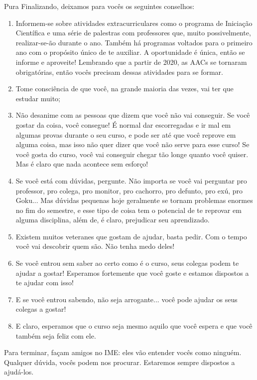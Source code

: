 \begin{subsecao}{Pura}
Finalizando, deixamos para vocês os seguintes conselhos:
\begin{enumerate}
\item Informem-se sobre atividades extracurriculares como o programa de
Iniciação Científica e uma série de palestras com professores que, muito possivelmente,
realizar-se-ão durante o ano. Também há programas voltados para o primeiro ano
com o propósito único de te auxiliar. A oportunidade é única, então se informe e aproveite!
Lembrando que a partir de 2020, as AACs se tornaram obrigatórias, então vocês precisam
dessas atividades para se formar.
\item Tome consciência de que você, na grande maioria das vezes, vai ter que
estudar muito;
\item Não desanime com as pessoas que dizem que você não vai conseguir. Se
você gostar da coisa, você consegue! É normal dar escorregadas e ir mal em algumas
provas durante o seu curso, e pode ser até que você reprove em alguma coisa,
mas isso não quer dizer que você não serve para esse curso! Se você gosta do curso,
você vai conseguir chegar tão longe quanto você quiser. Mas é claro que nada
acontece sem esforço!
\item Se você está com dúvidas, pergunte. Não importa se você vai perguntar
pro professor, pro colega, pro monitor, pro cachorro, pro defunto, pro exú, pro
Goku... Mas dúvidas pequenas hoje geralmente se tornam problemas enormes
no fim do semestre, e esse tipo de coisa tem o potencial de te reprovar em alguma
disciplina, além de, é claro, prejudicar seu aprendizado.
\item Existem muitos veteranes que gostam de ajudar, basta pedir. Com o tempo 
você vai descobrir quem são. Não tenha medo deles!
\item Se você entrou sem saber ao certo como é o curso, seus colegas podem
te ajudar a gostar! Esperamos fortemente que você goste e estamos dispostos a te ajudar com isso!
\item E se você entrou sabendo, não seja arrogante... você pode ajudar os seus
colegas a gostar!
\item E claro, esperamos que o curso seja mesmo aquilo que você
espera e que você também seja feliz com ele.

\end{enumerate}
Para terminar, façam amigos no IME: eles vão entender vocês como ninguém. Qualquer dúvida,
vocês podem nos procurar. Estaremos sempre dispostos a ajudá-los.

\end{subsecao}

